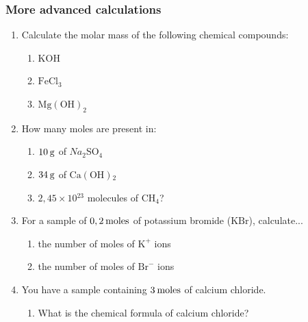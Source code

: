             \subsubsection{  More advanced calculations
      }
            \nopagebreak
      \label{m38717*id279756}\begin{enumerate}[noitemsep, label=\textbf{\arabic*}. ] 
            \label{m38717*uid47}\item Calculate the molar mass of the following chemical compounds:
\label{m38717*id279772}\begin{enumerate}[noitemsep, label=\textbf{\alph*}. ] 
            \label{m38717*uid48}\item $\mathrm{KOH}$
\label{m38717*uid49}\item $\mathrm{FeCl}{}_{3}$\label{m38717*uid50}\item ${\mathrm{Mg\left(OH\right)}}_{2}$\end{enumerate}
                \label{m38717*uid51}\item How many moles are present in:
\label{m38717*id279848}\begin{enumerate}[noitemsep, label=\textbf{\alph*}. ] 
            \label{m38717*uid52}\item $10\phantom{\rule{2pt}{0ex}}\mathrm{g}$ of $Na{}_{2}$SO${}_{4}$\label{m38717*uid53}\item $34\phantom{\rule{2pt}{0ex}}\mathrm{g}$ of $\mathrm{Ca\left(OH\right)}{}_{2}$\label{m38717*uid54}\item $2,45\ensuremath{\times}10{}^{23}$ molecules of $\mathrm{CH}{}_{4}$?
\end{enumerate}
                \label{m38717*uid55}\item For a sample of $0,2\phantom{\rule{2pt}{0ex}}\mathrm{moles}$ of potassium bromide ($\mathrm{KBr}$), calculate...
\label{m38717*id279964}\begin{enumerate}[noitemsep, label=\textbf{\alph*}. ] 
            \label{m38717*uid56}\item the number of moles of ${\mathrm{K}}^{+}$ ions
\label{m38717*uid57}\item the number of moles of ${\mathrm{Br}}^{-}$ ions
\end{enumerate}
                \label{m38717*uid58}\item You have a sample containing $3\phantom{\rule{2pt}{0ex}}\mathrm{moles}$ of calcium chloride.
\label{m38717*id280031}\begin{enumerate}[noitemsep, label=\textbf{\alph*}. ] 
            \label{m38717*uid59}\item What is the chemical formula of calcium chloride?

\end{enumerate}
\end{enumerate}
